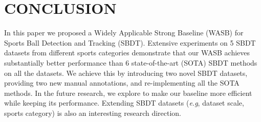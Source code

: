 \documentclass{bmvc2k}
\def\eg{\emph{e.g}\bmvaOneDot}
\begin{document}
\section{CONCLUSION}
\label{sec:conc}
In this paper we proposed a Widely Applicable Strong Baseline (WASB) for Sports Ball Detection and Tracking (SBDT).
Extensive experiments on 5 SBDT datasets from different sports categories demonstrate that our WASB achieves substantially better performance than 6 state-of-the-art (SOTA) SBDT methods on all the datasets.
We achieve this by introducing two novel SBDT datasets, providing two new manual annotations, and re-implementing all the SOTA methods.
In the future research, we explore to make our baseline more efficient while keeping its performance.
Extending SBDT datasets (\eg, dataset scale, sports category) is also an interesting research direction.
\begin{table*}[t]
\centering
{}
\caption{Ablations with respect to the model design ({\it cf.} \S \ref{sec:method:train}). Notice that in all the cases we do not adapt oversampling ({\it cf.} \S \ref{sec:method:infer}) for inference. }
\label{tab:ablation:model}
\end{table*}
\end{document}

